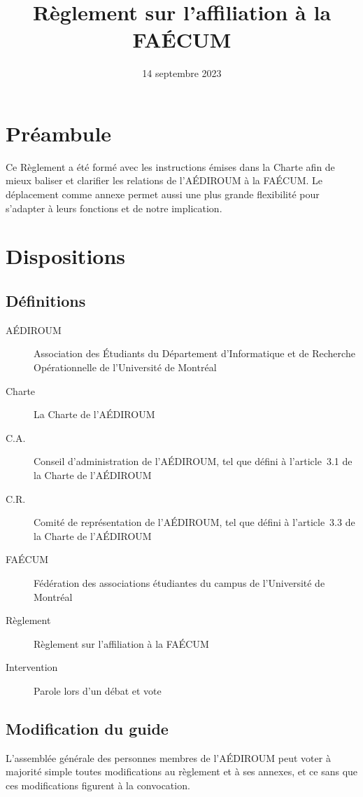 \documentclass{aediroum}
\title{Règlement sur l'affiliation à la FAÉCUM}
\date{14 septembre 2023}
\begin{document}
\maketitle

\section{Préambule}\label{sec:preambule}
Ce Règlement a été formé avec les instructions émises dans la Charte afin de mieux baliser et clarifier les relations de l'AÉDIROUM à la FAÉCUM. Le déplacement comme annexe permet aussi une plus grande flexibilité pour s'adapter à leurs fonctions et de notre implication.

\section{Dispositions}\label{sec:dispositions}

\subsection{Définitions}\label{sec:definitions}
\begin{description}
	\item[AÉDIROUM] Association des Étudiants du Département d'Informatique et de Recherche Opérationnelle de l'Université de Montréal
	\item[Charte] La Charte de l'AÉDIROUM
	\item[C.A.] Conseil d'administration de l'AÉDIROUM, tel que défini à l'article~3.1 de la Charte de l'AÉDIROUM
	\item[C.R.] Comité de représentation de l'AÉDIROUM, tel que défini à l'article~3.3 de la Charte de l'AÉDIROUM
	\item[FAÉCUM] Fédération des associations étudiantes du campus de l'Université de Montréal
	\item[Règlement] Règlement sur l'affiliation à la FAÉCUM
	\item[Intervention] Parole lors d'un débat et vote
\end{description}

\subsection{Modification du guide}\label{sec:modification-guide}
L'assemblée générale des personnes membres de l'AÉDIROUM peut voter à majorité simple toutes modifications au règlement et à ses annexes, et ce sans que ces modifications figurent à la convocation.
\end{document}
